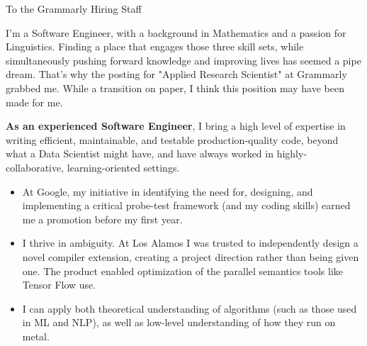 \documentclass[sans, a4paper]{article}
\newcommand{\cvcolor}[1]{{\color{MidnightBlue}#1}}
\renewcommand{\hl}[1]{\cvcolor{\textbf{#1}}}
\begin{document}
\begin{adjustwidth}{40pt}{40pt}

  To the Grammarly Hiring Staff \par \bigskip

  I'm a Software Engineer, with a background in Mathematics and a passion for
  Linguistics. Finding a place that engages those three skill sets, while
  simultaneously pushing forward knowledge and improving lives has seemed a
  pipe dream. That's why the posting for "Applied Research Scientist" at
  Grammarly grabbed me. While a transition on paper, I think this position may
  have been made for me. \medskip


  \hl{As an experienced Software Engineer}, I bring a high level of expertise
  in writing efficient, maintainable, and testable production-quality code,
  beyond what a Data Scientist might have, and have always worked in
  highly-collaborative, learning-oriented settings.

  \begin{itemize}
    \item At Google, my initiative in identifying the need for, designing, and
      implementing a critical probe-test framework (and my coding skills)
      earned me a promotion before my first year.
    \item I thrive in ambiguity. At Los Alamos I was trusted to independently
      design a novel compiler extension, creating a project direction rather
      than being given one. The product enabled optimization of the parallel
      semantics tools like Tensor Flow use.
    \item I can apply both theoretical understanding of algorithms (such as
      those used in ML and NLP), as well as low-level understanding of how they
      run on metal.

  \end{itemize} \medskip


\end{adjustwidth}
\end{document}
